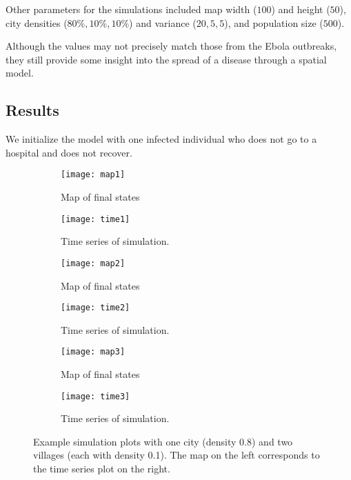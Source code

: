 Other parameters for the simulations included map width ($100$) and height ($50$), city densities ($80\%, 10\%, 10\%$) and variance ($20,5,5$), and population size ($500$).

Although the values may not precisely match those from the Ebola outbreaks, they still provide some insight into the spread of a disease through a spatial model.


\subsection{Results}

We initialize the model with one infected individual who does not go to a hospital and does not recover. 

\begin{figure}
\centering
\begin{subfigure}[t]{0.38\textwidth}
  \texttt{[image: map1]} 
  \caption{Map of final states}
\end{subfigure}
\begin{subfigure}[t]{0.56\textwidth}
  \texttt{[image: time1]}
  \caption{Time series of simulation.}
\end{subfigure}
\begin{subfigure}[t]{0.38\textwidth}
  \texttt{[image: map2]} 
  \caption{Map of final states}
\end{subfigure}
\begin{subfigure}[t]{0.56\textwidth}
  \texttt{[image: time2]}
  \caption{Time series of simulation.}
\end{subfigure}
\begin{subfigure}[t]{0.38\textwidth}
  \texttt{[image: map3]} 
  \caption{Map of final states}
\end{subfigure}
\begin{subfigure}[t]{0.56\textwidth}
  \texttt{[image: time3]}
  \caption{Time series of simulation.}
\end{subfigure}
\caption{Example simulation plots with one city (density 0.8) and two villages (each with density 0.1). The map on the left corresponds to the time series plot on the right.}
\end{figure}
